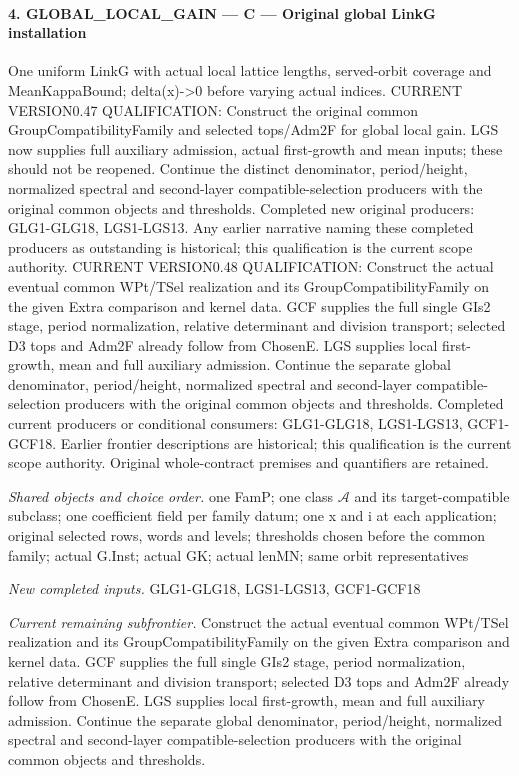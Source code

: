 \documentclass[11pt,a4paper]{article}
\numberwithin{equation}{section}
\theoremstyle{remark}\newtheorem{remark}[theorem]{Remark}
\begin{document}
\paragraph{4. GLOBAL\_\allowbreak LOCAL\_\allowbreak GAIN — C — Original global LinkG installation}

One uniform LinkG with actual local lattice lengths, served-orbit coverage and MeanKappaBound; delta(x)->0 before varying actual indices. CURRENT VERSION0.47 QUALIFICATION: Construct the original common GroupCompatibilityFamily and selected tops/Adm2F for global local gain. LGS now supplies full auxiliary admission, actual first-growth and mean inputs; these should not be reopened. Continue the distinct denominator, period/height, normalized spectral and second-layer compatible-selection producers with the original common objects and thresholds. Completed new original producers: GLG1-GLG18, LGS1-LGS13. Any earlier narrative naming these completed producers as outstanding is historical; this qualification is the current scope authority. CURRENT VERSION0.48 QUALIFICATION: Construct the actual eventual common WPt/TSel realization and its GroupCompatibilityFamily on the given Extra comparison and kernel data. GCF supplies the full single GIs2 stage, period normalization, relative determinant and division transport; selected D3 tops and Adm2F already follow from ChosenE. LGS supplies local first-growth, mean and full auxiliary admission. Continue the separate global denominator, period/height, normalized spectral and second-layer compatible-selection producers with the original common objects and thresholds. Completed current producers or conditional consumers: GLG1-GLG18, LGS1-LGS13, GCF1-GCF18. Earlier frontier descriptions are historical; this qualification is the current scope authority. Original whole-contract premises and quantifiers are retained.

\emph{Shared objects and choice order.} one FamP; one class $\mathcal A$ and its target-compatible subclass; one coefficient field per family datum; one x and i at each application; original selected rows, words and levels; thresholds chosen before the common family; actual G.Inst; actual GK; actual lenMN; same orbit representatives

\emph{New completed inputs.} GLG1-GLG18, LGS1-LGS13, GCF1-GCF18

\emph{Current remaining subfrontier.} Construct the actual eventual common WPt/TSel realization and its GroupCompatibilityFamily on the given Extra comparison and kernel data. GCF supplies the full single GIs2 stage, period normalization, relative determinant and division transport; selected D3 tops and Adm2F already follow from ChosenE. LGS supplies local first-growth, mean and full auxiliary admission. Continue the separate global denominator, period/height, normalized spectral and second-layer compatible-selection producers with the original common objects and thresholds.
\end{document}
